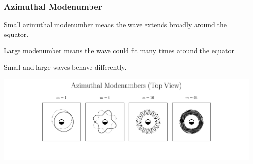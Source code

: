 \documentclass{beamer}
\begin{document}

\begin{frame}
\frametitle{Azimuthal Modenumber}

\begin{wideitemize}
\item Small azimuthal modenumber means the wave extends broadly around the equator. 
\item Large modenumber means the wave could fit many times around the equator. 
\item Small-\azm and large-\azm waves behave differently. 
\end{wideitemize}

\vfill

\centerline{\includegraphics[width=1.2\textwidth]{figures/modenumber.pdf}}


\end{frame}

\end{document}
